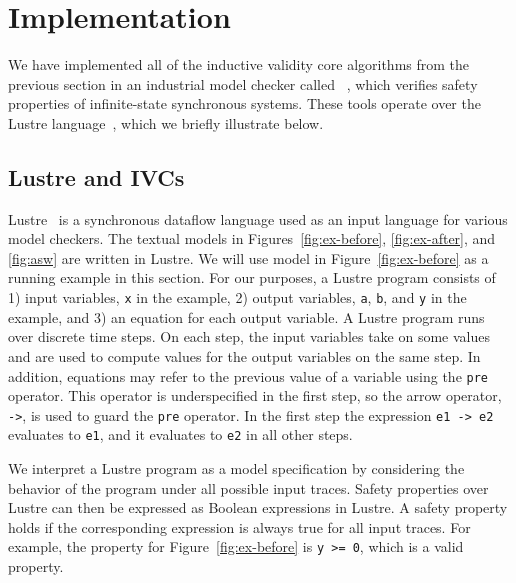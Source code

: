 \section{Implementation}
\label{sec:impl}

We have implemented all of the inductive validity core algorithms from the previous section in an industrial model checker called \jkind~\cite{jkind},
which verifies safety properties of infinite-state synchronous systems.
These tools operate over the Lustre language~\cite{Halbwachs91:lustre}, which we briefly illustrate below.

\subsection{Lustre and IVCs}
\label{sec:lustre}

Lustre~\cite{Halbwachs91:lustre} is a synchronous dataflow language
used as an input language for various model checkers. The textual
models in Figures~\ref{fig:ex-before}, \ref{fig:ex-after}, and \ref{fig:asw} are
written in Lustre. We will use model in Figure~\ref{fig:ex-before} as
a running example in this section. For our purposes, a Lustre program
consists of 1) input variables, {\tt x} in the example, 2) output
variables, {\tt a}, {\tt b}, and {\tt y} in the example, and 3) an
equation for each output variable. A Lustre program runs over discrete
time steps. On each step, the input variables take on some values and
are used to compute values for the output variables on the same step.
In addition, equations may refer to the previous value of a variable
using the {\tt pre} operator. This operator is underspecified in the
first step, so the arrow operator, {\tt ->}, is used to guard the
{\tt pre} operator. In the first step the expression {\tt e1 -> e2}
evaluates to {\tt e1}, and it evaluates to {\tt e2} in all other steps.

We interpret a Lustre program as a model specification by considering
the behavior of the program under all possible input traces. Safety
properties over Lustre can then be expressed as Boolean expressions in
Lustre. A safety property holds if the corresponding expression is
always true for all input traces. For example, the property for
Figure~\ref{fig:ex-before} is {\tt y >= 0}, which is a valid property.

